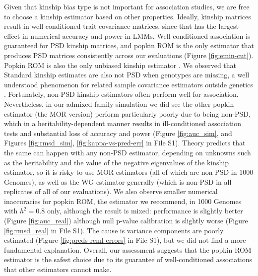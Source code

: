 \documentclass[9pt,twocolumn,twoside]{gsajnl}
\begin{document}
Given that kinship bias type is not important for association studies, we are free to choose a kinship estimator based on other properties.
Ideally, kinship matrices result in well conditioned trait covariance matrices, since that has the largest effect in numerical accuracy and power in LMMs.
Well-conditioned association is guaranteed for PSD kinship matrices, and popkin ROM is the only estimator that produces PSD matrices consistently across our evaluations (Figure \ref{fig:emin-cut}).
Popkin ROM is also the only unbiased kinship estimator \citep{ochoa_estimating_2021}.
We observed that Standard kinship estimates are also not PSD when genotypes are missing, a well understood phenomenon for related sample covariance estimators outside genetics \citep{jurczak_spectral_2017}.
Fortunately, non-PSD kinship estimators often perform well for association.
Nevertheless, in our admixed family simulation we did see the other popkin estimator (the MOR version) perform particularly poorly due to being non-PSD, which in a heritability-dependent manner results in ill-conditioned association tests and substantial loss of accuracy and power (Figure \ref{fig:auc_sim}, and Figures \ref*{fig:rmsd_sim}, \ref*{fig:kappa-vs-pred-err} in File S1).
Theory predicts that the same can happen with any non-PSD estimator, depending on unknowns such as the heritability and the value of the negative eigenvalues of the kinship estimator, so it is risky to use MOR estimators (all of which are non-PSD in 1000 Genomes), as well as the WG estimator generally (which is non-PSD in all replicates of all of our evaluations).
We also observe smaller numerical inaccuracies for popkin ROM, the estimator we recommend, in 1000 Genomes with $h^2=0.8$ only, although the result is mixed: performance is slightly better (Figure \ref{fig:auc_real}) although null p-value calibration is slightly worse (Figure \ref*{fig:rmsd_real} in File S1).
The cause is variance components are poorly estimated (Figure \ref*{fig:preds-reml-errors} in File S1), but we did not find a more fundamental explanation.
Overall, our assessment suggests that the popkin ROM estimator is the safest choice due to its guarantee of well-conditioned associations that other estimators cannot make.
\end{document}
